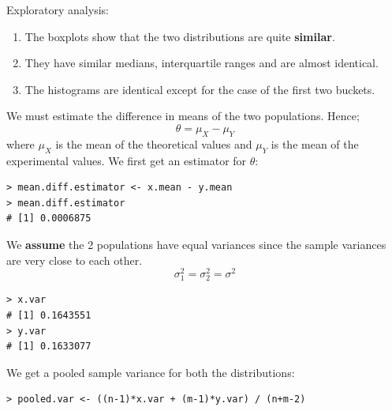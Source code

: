 \documentclass[12pt,letterpaper,titlepage,en-US]{article}
\begin{document}
Exploratory analysis:
\begin{enumerate}
\item The boxplots show that the two distributions are quite \textbf{similar}.
\item They have similar medians, interquartile ranges and are almost identical.
\item The histograms are identical except for the case of the first two buckets.
\end{enumerate}
We must estimate the difference in means of the two populations. Hence;
\begin{equation}
\theta = \mu_{X} - \mu_{Y}
\end{equation}
where $\mu_{X}$ is the mean of the theoretical values and $\mu_{Y}$ is the mean of the experimental values. We first get an estimator for $\theta$:
\begin{knitrout}
\color{fgcolor}
\begin{kframe}
\begin{verbatim}
> mean.diff.estimator <- x.mean - y.mean
> mean.diff.estimator
# [1] 0.0006875
\end{verbatim}
\end{kframe}
\end{knitrout}


We \textbf{assume} the 2 populations have equal variances since the sample variances are very close to each other.
\begin{equation}
\sigma_{1}^{2} = \sigma^{2}_{2}= \sigma^{2}
\end{equation}
\begin{knitrout}
\color{fgcolor}
\begin{kframe}
\begin{verbatim}
> x.var
# [1] 0.1643551
> y.var
# [1] 0.1633077
\end{verbatim}
\end{kframe}
\end{knitrout}


We get a pooled sample variance for both the distributions:
\begin{knitrout}
\color{fgcolor}
\begin{kframe}
\begin{verbatim}
> pooled.var <- ((n-1)*x.var + (m-1)*y.var) / (n+m-2)
\end{verbatim}
\end{kframe}
\end{knitrout}
\end{document}
